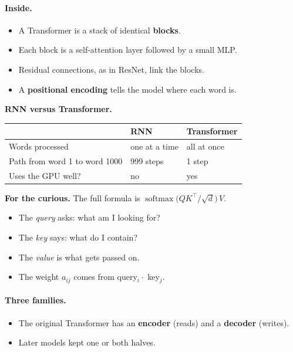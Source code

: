 \documentclass[12pt, a4paper]{article}
\begin{document}
\paragraph{Inside.}
\begin{itemize}
  \item A Transformer is a stack of identical \textbf{blocks}.
  \item Each block is a self-attention layer followed by a small MLP.
  \item Residual connections, as in ResNet, link the blocks.
  \item A \textbf{positional encoding} tells the model where each word is.
\end{itemize}

\begin{notebox}
  \textbf{RNN versus Transformer.}
  \begin{center}
    \renewcommand{\arraystretch}{1.4}
    \begin{tabular}{lll}
      \toprule
                                    & RNN           & Transformer \\
      \midrule
      Words processed               & one at a time & all at once \\
      Path from word 1 to word 1000 & 999 steps     & 1 step      \\
      Uses the GPU well?            & no            & yes         \\
      \bottomrule
    \end{tabular}
  \end{center}
\end{notebox}

\begin{notebox}
  \textbf{For the curious.}
  The full formula is $\operatorname{softmax}\!\big(QK^{\top}/\sqrt{d}\big)\,V$.
  \begin{itemize}
    \item The \emph{query} asks: what am I looking for?
    \item The \emph{key} says: what do I contain?
    \item The \emph{value} is what gets passed on.
    \item The weight $a_{ij}$ comes from query$_i \cdot$ key$_j$.
  \end{itemize}
\end{notebox}

\paragraph{Three families.}
\begin{itemize}
  \item The original Transformer has an \textbf{encoder} (reads) and a
        \textbf{decoder} (writes).
  \item Later models kept one or both halves.
\end{itemize}
\end{document}
